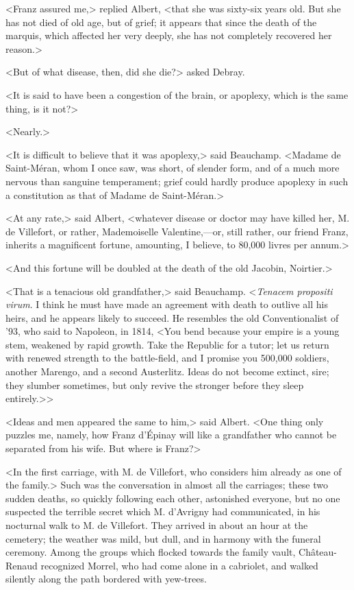  <Franz assured me,> replied Albert, <that she was sixty-six years old. But she has not died of old age, but of grief; it appears that since the death of the marquis, which affected her very deeply, she has not completely recovered her reason.> 

 <But of what disease, then, did she die?> asked Debray. 

 <It is said to have been a congestion of the brain, or apoplexy, which is the same thing, is it not?> 

 <Nearly.> 

 <It is difficult to believe that it was apoplexy,> said Beauchamp. <Madame de Saint-Méran, whom I once saw, was short, of slender form, and of a much more nervous than sanguine temperament; grief could hardly produce apoplexy in such a constitution as that of Madame de Saint-Méran.> 

 <At any rate,> said Albert, <whatever disease or doctor may have killed her, M. de Villefort, or rather, Mademoiselle Valentine,—or, still rather, our friend Franz, inherits a magnificent fortune, amounting, I believe, to 80,000 livres per annum.> 

 <And this fortune will be doubled at the death of the old Jacobin, Noirtier.> 

 <That is a tenacious old grandfather,> said Beauchamp. <\textit{Tenacem propositi virum}. I think he must have made an agreement with death to outlive all his heirs, and he appears likely to succeed. He resembles the old Conventionalist of '93, who said to Napoleon, in 1814, <You bend because your empire is a young stem, weakened by rapid growth. Take the Republic for a tutor; let us return with renewed strength to the battle-field, and I promise you 500,000 soldiers, another Marengo, and a second Austerlitz. Ideas do not become extinct, sire; they slumber sometimes, but only revive the stronger before they sleep entirely.>> 

 <Ideas and men appeared the same to him,> said Albert. <One thing only puzzles me, namely, how Franz d'Épinay will like a grandfather who cannot be separated from his wife. But where is Franz?> 

 <In the first carriage, with M. de Villefort, who considers him already as one of the family.>  Such was the conversation in almost all the carriages; these two sudden deaths, so quickly following each other, astonished everyone, but no one suspected the terrible secret which M. d'Avrigny had communicated, in his nocturnal walk to M. de Villefort. They arrived in about an hour at the cemetery; the weather was mild, but dull, and in harmony with the funeral ceremony. Among the groups which flocked towards the family vault, Château-Renaud recognized Morrel, who had come alone in a cabriolet, and walked silently along the path bordered with yew-trees. 

